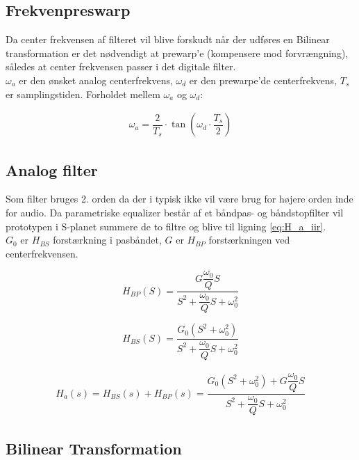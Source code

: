     \subsection{Frekvenpreswarp}
    Da center frekvensen af filteret vil blive forskudt når der udføres en Bilinear
    transformation er det nødvendigt at prewarp'e (kompensere mod forvrængning), således at center frekvensen passer i det digitale filter.\\
    $\omega_a$ er den ønsket analog centerfrekvens, $\omega_d$ er den prewarpe'de centerfrekvens, $T_s$ er samplingstiden. 
    Forholdet mellem $\omega_a$ og $\omega_d$:



    \begin{align}
    \omega_a = \dfrac{2}{T_s} \cdot \tan\left( \omega_d \cdot \dfrac{T_s}{2} \right) 
    \end{align}


    \subsection{Analog filter}
    Som filter bruges 2. orden da der i typisk ikke vil være brug for højere orden
     inde for audio. Da parametriske equalizer består af et båndpas- og båndstopfilter
     vil prototypen i S-planet summere de to filtre og blive til ligning \ref{eq:H_a_iir}. \\
     $G_0$ er $H_{BS}$ forstærkning i pasbåndet, $G $ er $H_{BP}$ forstærkningen ved centerfrekvensen.

    
    \begin{equation}
    H_{BP}(S) = \dfrac{G \dfrac{\omega_0}{Q} S}{S^2 + \dfrac{\omega_0}{Q} S + \omega_0^2}
    \end{equation}

    \begin{equation}
    H_{BS}(S) = \dfrac{G_0 \left(S^2 + \omega_0^2 \right) }{S^2 + \dfrac{\omega_0}{Q} S + \omega_0^2}
    \end{equation}

    \begin{align}
    H_a(s) = H_{BS}(s) +H_{BP}(s) = \dfrac{G_0 \left(S^2 + \omega_0^2 \right) +G \dfrac{\omega_0}{Q} S  }{S^2 + \dfrac{\omega_0}{Q} S + \omega_0^2}
    \label{eq:H_a_iir}
    \end{align}

    \subsection{Bilinear Transformation}


